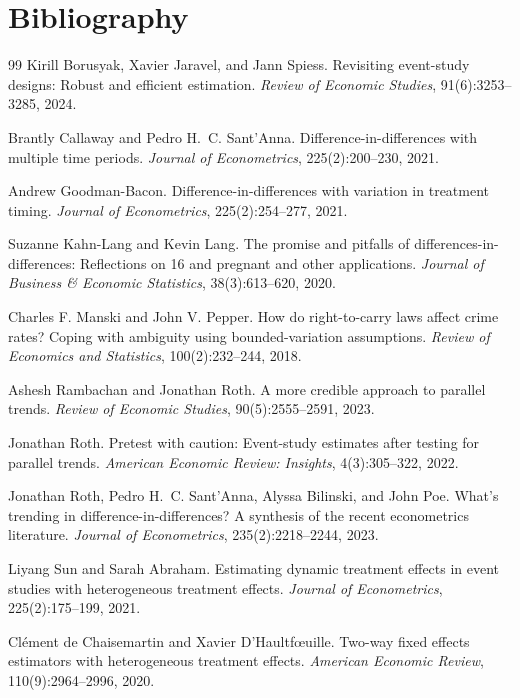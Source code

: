 \documentclass[11pt]{article}
\theoremstyle{definition}
\theoremstyle{plain}
\theoremstyle{remark}
\begin{document}
\section*{Bibliography}
\begin{thebibliography}{99}
Kirill Borusyak, Xavier Jaravel, and Jann Spiess.
\newblock Revisiting event-study designs: Robust and efficient estimation.
\newblock \emph{Review of Economic Studies}, 91(6):3253--3285, 2024.

Brantly Callaway and Pedro H.~C. Sant'Anna.
\newblock Difference-in-differences with multiple time periods.
\newblock \emph{Journal of Econometrics}, 225(2):200--230, 2021.

Andrew Goodman-Bacon.
\newblock Difference-in-differences with variation in treatment timing.
\newblock \emph{Journal of Econometrics}, 225(2):254--277, 2021.

Suzanne Kahn-Lang and Kevin Lang.
\newblock The promise and pitfalls of differences-in-differences: Reflections on 16 and pregnant and other applications.
\newblock \emph{Journal of Business \& Economic Statistics}, 38(3):613--620, 2020.

Charles F. Manski and John V. Pepper.
\newblock How do right-to-carry laws affect crime rates? Coping with ambiguity using bounded-variation assumptions.
\newblock \emph{Review of Economics and Statistics}, 100(2):232--244, 2018.

Ashesh Rambachan and Jonathan Roth.
\newblock A more credible approach to parallel trends.
\newblock \emph{Review of Economic Studies}, 90(5):2555--2591, 2023.

Jonathan Roth.
\newblock Pretest with caution: Event-study estimates after testing for parallel trends.
\newblock \emph{American Economic Review: Insights}, 4(3):305--322, 2022.

Jonathan Roth, Pedro H.~C. Sant'Anna, Alyssa Bilinski, and John Poe.
\newblock What's trending in difference-in-differences? A synthesis of the recent econometrics literature.
\newblock \emph{Journal of Econometrics}, 235(2):2218--2244, 2023.

Liyang Sun and Sarah Abraham.
\newblock Estimating dynamic treatment effects in event studies with heterogeneous treatment effects.
\newblock \emph{Journal of Econometrics}, 225(2):175--199, 2021.

Cl\'ement de Chaisemartin and Xavier D'Haultf{\oe}uille.
\newblock Two-way fixed effects estimators with heterogeneous treatment effects.
\newblock \emph{American Economic Review}, 110(9):2964--2996, 2020.
\end{thebibliography}
\end{document}
